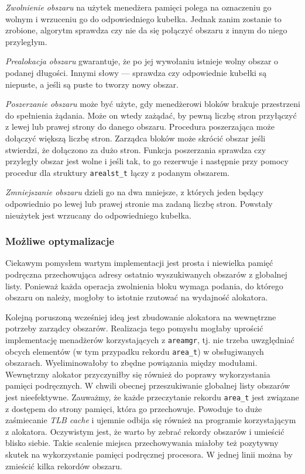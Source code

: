 \documentclass[12pt,a4paper,titlepage,twoside]{mwart}
\begin{document}
\textit{Zwolnienie obszaru} na użytek menedżera pamięci polega na oznaczeniu go
wolnym i wrzuceniu go do odpowiedniego kubełka. Jednak zanim zostanie to zrobione,
algorytm sprawdza czy nie da się połączyć obszaru z innym do niego przyległym.

\textit{Prealokacja obszaru} gwarantuje, że po jej wywołaniu istnieje wolny
obszar o podanej długości. Innymi słowy --- sprawdza czy odpowiednie kubełki są
niepuste, a jeśli są puste to tworzy nowy obszar.

\textit{Poszerzanie obszaru} może być użyte, gdy menedżerowi bloków brakuje
przestrzeni do spełnienia żądania. Może on wtedy zażądać, by pewną liczbę stron
przyłączyć z lewej lub prawej strony do danego obszaru. Procedura poszerzająca
może dołączyć większą liczbę stron. Zarządca bloków może skrócić obszar jeśli
stwierdzi, że dołączono za dużo stron. Funkcja poszerzania sprawdza czy
przyległy obszar jest wolne i jeśli tak, to go rezerwuje i następnie przy pomocy
procedur dla struktury \verb+arealst_t+ łączy z podanym obszarem.

\textit{Zmniejszanie obszaru} dzieli go na dwa mniejsze, z których jeden będący
odpowiednio po lewej lub prawej stronie ma zadaną liczbę stron. Powstały
nieużytek jest wrzucany do odpowiedniego kubełka.

\subsubsection{Możliwe optymalizacje}

Ciekawym pomysłem wartym implementacji jest prosta i niewielka pamięć podręczna
przechowująca adresy ostatnio wyszukiwanych obszarów z globalnej listy.
Ponieważ każda operacja zwolnienia bloku wymaga podania, do którego obszaru on
należy, mogłoby to istotnie rzutować na wydajność alokatora.

Kolejną poruszoną wcześniej ideą jest zbudowanie alokatora na wewnętrzne
potrzeby zarządcy obszarów. Realizacja tego pomysłu mogłaby uprościć
implementację menadżerów korzystających z \texttt{areamgr}, tj. nie trzeba
uwzględniać obcych elementów (w tym przypadku rekordu \texttt{area\_t}) w
obsługiwanych obszarach. Wyeliminowałoby to zbędne powiązania między modułami.
Wewnętrzny alokator przyczyniłby się również do poprawy wykorzystania pamięci
podręcznych. W chwili obecnej przeszukiwanie globalnej listy obszarów jest
nieefektywne. Zauważmy, że każde przeczytanie rekordu \texttt{area\_t} jest
związane z dostępem do strony pamięci, która go przechowuje. Powoduje to duże
zaśmiecanie \textit{TLB cache} i ujemnie odbija się również na programie
korzystającym z alokatora. Oczywistym jest, że warto by zebrać rekordy obszarów
i umieścić blisko siebie. Takie scalenie miejsca przechowywania miałoby też
pozytywny skutek na wykorzystanie pamięci podręcznej procesora. W jednej linii
można by zmieścić kilka rekordów obszaru.
\end{document}
